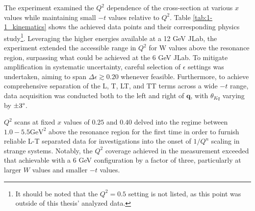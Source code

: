 \documentclass[
]{report}
\begin{document}
The experiment examined the \(Q^2\) dependence of the cross-section at
various \(x\) values while maintaining small \(-t\) values relative to
\(Q^2\). Table \ref{tab:1-1_kinematics} shows the achieved data points
and their corresponding physics
study\footnote{It should be noted that the $Q^2=0.5$ setting is not listed, as this point was outside of this thesis' analyzed data.}.
Leveraging the higher energies available at a 12 GeV JLab, the
experiment extended the accessible range in \(Q^2\) for W values above
the resonance region, surpassing what could be achieved at the 6 GeV
JLab. To mitigate amplification in systematic uncertainty, careful
selection of \(\epsilon\) settings was undertaken, aiming to span
\(\Delta\epsilon\gtrsim 0.20\) whenever feasible. Furthermore, to
achieve comprehensive separation of the L, T, LT, and TT terms across a
wide \(-t\) range, data acquisition was conducted both to the left and
right of \(\mathbf{q}\), with \(\theta_{Kq}\) varying by
\(\pm 3\degree\).



\(Q^2\) scans at fixed \(x\) values of \(0.25\) and \(0.40\) delved into
the regime between \(1.0-5.5 \mathrm{GeV}^2\) above the resonance region
for the first time in order to furnish reliable L-T separated data for
investigations into the onset of \(1/Q^n\) scaling in strange systems.
Notably, the \(Q^2\) coverage achieved in the measurement exceeded that
achievable with a 6 GeV configuration by a factor of three, particularly
at larger \(W\) values and smaller \(-t\) values.

\label{Chapter-2}
\end{document}
